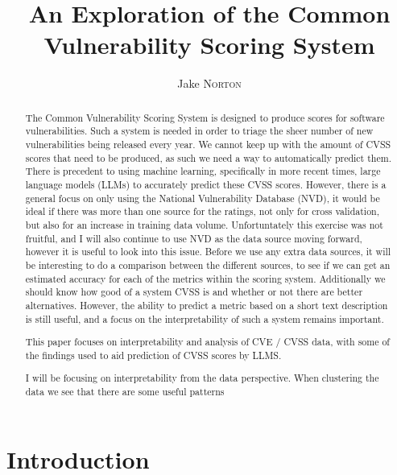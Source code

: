 \documentclass[12pt]{article}
\title{An Exploration of the Common Vulnerability Scoring System}
\author{Jake \textsc{Norton}}
\begin{document}
\maketitle

\begin{abstract}

	The Common Vulnerability Scoring System is designed to produce scores for software
	vulnerabilities. Such a system is needed in order to triage the sheer number of new
	vulnerabilities being released every year. We cannot keep up with the amount of CVSS scores that
	need to be produced, as such we need a way to automatically predict them. There is precedent to
	using machine learning, specifically in more recent times, large language models (LLMs) to
	accurately predict these CVSS scores. However, there is a general focus on only using the
	National Vulnerability Database (NVD), it would be ideal if there was more than one source for
	the ratings, not only for cross validation, but also for an increase in training data volume.
	Unfortuntately this exercise was not fruitful, and I will also continue to use NVD as the data
	source moving forward, however it is useful to look into this issue.
	Before we use any extra data sources, it will be interesting to do a comparison between the
	different sources, to see if we can get an estimated accuracy for each of the metrics within the
	scoring system. Additionally we should know how good of a system CVSS is and whether or not
	there are better alternatives. However, the ability to predict a metric based on a short text
	description is still useful, and a focus on the interpretability of such a system remains
	important.

	This paper focuses on interpretability and analysis of CVE / CVSS data, with some of the
	findings used to aid prediction of CVSS scores by LLMS.

	I will be focusing on interpretability from the data perspective. When clustering the
	data we see that there are some useful patterns

\end{abstract}


\section{Introduction}
\end{document}
